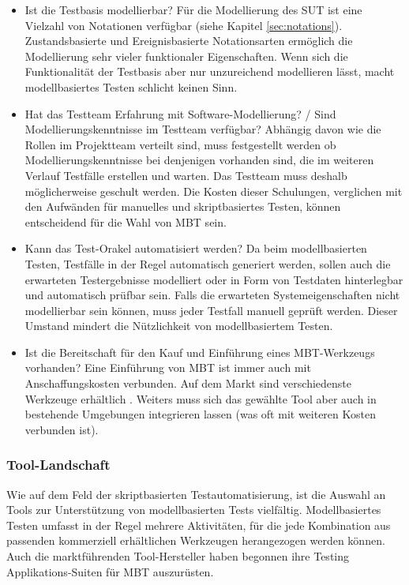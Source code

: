 \begin{itemize}
\item Ist die Testbasis modellierbar?
Für die Modellierung des SUT ist eine Vielzahl von Notationen verfügbar (siehe Kapitel \ref{sec:notations}). Zustandsbasierte und Ereignisbasierte Notationsarten ermöglich die Modellierung sehr vieler funktionaler Eigenschaften. Wenn sich die Funktionalität der Testbasis aber nur unzureichend modellieren lässt, macht modellbasiertes Testen schlicht keinen Sinn.
\item Hat das Testteam Erfahrung mit Software-Modellierung? / Sind Modellierungskenntnisse im Testteam verfügbar?
Abhängig davon wie die Rollen im Projektteam verteilt sind, muss festgestellt werden ob Modellierungskenntnisse bei denjenigen vorhanden sind, die im weiteren Verlauf Testfälle erstellen und warten. Das Testteam muss deshalb möglicherweise geschult werden. Die Kosten dieser Schulungen, verglichen mit den Aufwänden für manuelles und skriptbasiertes Testen, können entscheidend für die Wahl von MBT sein.
\item Kann das Test-Orakel automatisiert werden?
Da beim modellbasierten Testen, Testfälle in der Regel automatisch generiert werden, sollen auch die erwarteten Testergebnisse modelliert oder in Form von Testdaten hinterlegbar und automatisch prüfbar sein. Falls die erwarteten Systemeigenschaften nicht modellierbar sein können, muss jeder Testfall manuell geprüft werden. Dieser Umstand mindert die Nützlichkeit von modellbasiertem Testen.
\item Ist die Bereitschaft für den Kauf und Einführung eines MBT-Werkzeugs vorhanden?
Eine Einführung von MBT ist immer auch mit Anschaffungskosten verbunden. Auf dem Markt sind verschiedenste Werkzeuge erhältlich . Weiters muss sich das gewählte Tool aber auch in bestehende Umgebungen integrieren lassen (was oft mit weiteren Kosten verbunden ist).
\end{itemize}

\subsubsection{Tool-Landschaft}
Wie auf dem Feld der skriptbasierten Testautomatisierung, ist die Auswahl an Tools zur Unterstützung von modellbasierten Tests vielfältig. Modellbasiertes Testen umfasst in der Regel mehrere Aktivitäten, für die jede Kombination aus passenden kommerziell erhältlichen Werkzeugen herangezogen werden können. Auch die marktführenden Tool-Hersteller haben begonnen ihre Testing Applikations-Suiten für MBT auszurüsten. 

